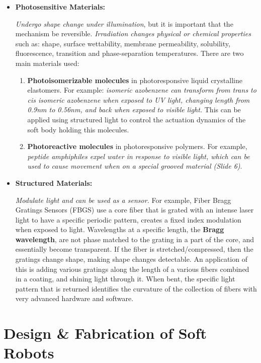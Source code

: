 \documentclass[onecolumn,a4paper]{article}
\begin{document}
\begin{itemize}
    \item \textbf{Photosensitive Materials:}

    \emph{Undergo shape change under illumination}, but it is important that the mechanism be reversible. \emph{Irradiation changes physical or chemical properties} such as: shape, surface wettability, membrane permeability, solubility, fluorescence, transition and phase-separation temperatures. There are two main materials used:
    \begin{enumerate}
        \item \textbf{Photoisomerizable molecules} in photoresponsive liquid crystalline elastomers. For example: \emph{isomeric azobenzene can transform from trans to cis isomeric azobenzene when exposed to UV light, changing length from 0.9nm to 0.56nm, and back when exposed to visible light.} This can be applied using structured light to control the actuation dynamics of the soft body holding this molecules.
        \item \textbf{Photoreactive molecules} in photoresponsive polymers. For example, \emph{peptide amphiphiles expel water in response to visible light, which can be used to cause movement when on a special grooved material (Slide 6)}.
    \end{enumerate}

    \item \textbf{Structured Materials:}

    \emph{Modulate light and can be used as a sensor.} For example, Fiber Bragg Gratings Sensors (FBGS) use a core fiber that is grated with an intense laser light to have a specific periodic pattern, creates a fixed index modulation when exposed to light. Wavelengths at a specific length, the \textbf{Bragg wavelength}, are not phase matched to the grating in a part of the core, and essentially become transparent. If the fiber is stretched/compressed, then the gratings change shape, making shape changes detectable. An application of this is adding various gratings along the length of a various fibers combined in a coating, and shining light through it. When bent, the specific light pattern that is returned identifies the curvature of the collection of fibers with very advanced hardware and software.
    
\end{itemize}

\section{Design \& Fabrication of Soft Robots}
\end{document}
